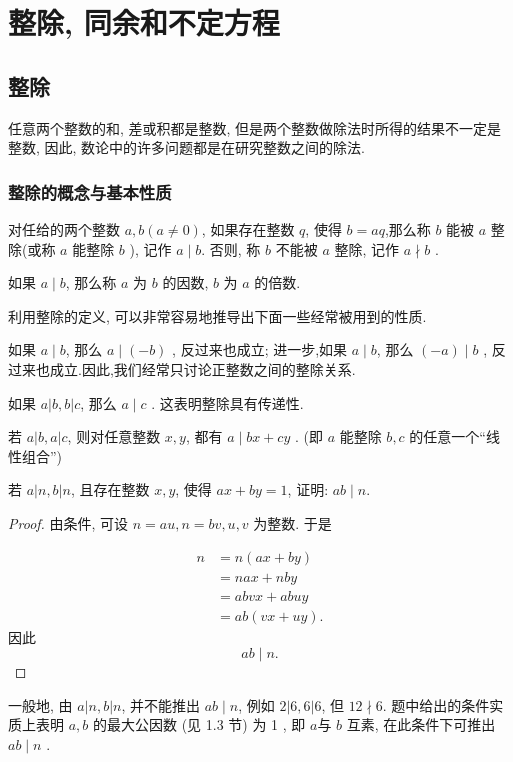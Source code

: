 \chapter{整除, 同余和不定方程}
\section{整除}
任意两个整数的和, 差或积都是整数, 但是两个整数做除法时所得的结果不一定是整数, 因此, 数论中的许多问题都是在研究整数之间的除法.

\subsection{整除的概念与基本性质}
\begin{definition}
	对任给的两个整数 $a ,  b(a \neq 0)$, 如果存在整数 $q$, 使得 $b=a q$,那么称 $b$ 能被 $a$ 整除(或称 $a$ 能整除 $b$ ), 记作 $a \mid b$. 否则, 称 $b$ 不能被 $a$ 整除, 记作 $a \nmid b$ .

	如果 $a \mid b$, 那么称 $a$ 为 $b$ 的因数, $b$ 为 $a$ 的倍数.
\end{definition}

利用整除的定义, 可以非常容易地推导出下面一些经常被用到的性质.

\begin{property}
	如果 $a \mid b$, 那么 $a \mid(-b)$ , 反过来也成立; 进一步,如果 $a \mid b$, 那么 $(-a) \mid b$ , 反过来也成立.因此,我们经常只讨论正整数之间的整除关系.
\end{property}


\begin{property}
	如果 $a|b, b| c$, 那么 $a \mid c$ . 这表明整除具有传递性.
\end{property}

\begin{property}\label{prop:整除的性质——“线性组合”}
	若 $a|b, a| c$, 则对任意整数 $x ,  y$, 都有 $a \mid b x+c y$ . (即 $a$ 能整除 $b ,  c$ 的任意一个“线性组合”)
\end{property}

\begin{example}\label{ex:整除的概念与基本性质-例1}
	若 $a|n, b| n$, 且存在整数 $x ,  y$, 使得 $a x+b y=1$, 证明: $a b \mid n$.
\end{example}
\begin{proof}
	由条件, 可设 $n=a u, n=b v, u ,  v$ 为整数. 于是

	\begin{align*}
		n & =n(a x+b y)      \\
		  & =n a x+n b y     \\
		  & =a b v x+a b u y \\
		  & =a b(v x+u y).
	\end{align*}
	因此
	\begin{equation*}
		a b \mid n.
	\end{equation*}
\end{proof}
\begin{note}
	一般地, 由 $a|n, b| n$, 并不能推出 $a b \mid n$, 例如 $2|6,6| 6$, 但 $12 \nmid 6$. 题中给出的条件实质上表明 $a ,  b$ 的最大公因数 (见 1.3 节) 为 1 , 即 $a$与 $b$ 互素, 在此条件下可推出 $a b \mid n$ .
\end{note}

